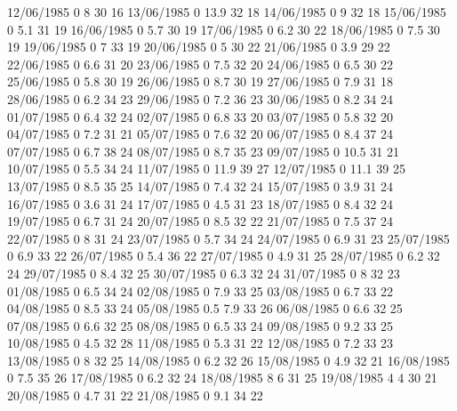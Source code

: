 12/06/1985  0      8      30     16 
13/06/1985  0      13.9   32     18 
14/06/1985  0      9      32     18 
15/06/1985  0      5.1    31     19 
16/06/1985  0      5.7    30     19 
17/06/1985  0      6.2    30     22 
18/06/1985  0      7.5    30     19 
19/06/1985  0      7      33     19 
20/06/1985  0      5      30     22 
21/06/1985  0      3.9    29     22 
22/06/1985  0      6.6    31     20 
23/06/1985  0      7.5    32     20 
24/06/1985  0      6.5    30     22 
25/06/1985  0      5.8    30     19 
26/06/1985  0      8.7    30     19 
27/06/1985  0      7.9    31     18 
28/06/1985  0      6.2    34     23 
29/06/1985  0      7.2    36     23 
30/06/1985  0      8.2    34     24 
01/07/1985  0      6.4    32     24 
02/07/1985  0      6.8    33     20 
03/07/1985  0      5.8    32     20 
04/07/1985  0      7.2    31     21 
05/07/1985  0      7.6    32     20 
06/07/1985  0      8.4    37     24 
07/07/1985  0      6.7    38     24 
08/07/1985  0      8.7    35     23 
09/07/1985  0      10.5   31     21 
10/07/1985  0      5.5    34     24 
11/07/1985  0      11.9   39     27 
12/07/1985  0      11.1   39     25 
13/07/1985  0      8.5    35     25 
14/07/1985  0      7.4    32     24 
15/07/1985  0      3.9    31     24 
16/07/1985  0      3.6    31     24 
17/07/1985  0      4.5    31     23 
18/07/1985  0      8.4    32     24 
19/07/1985  0      6.7    31     24 
20/07/1985  0      8.5    32     22 
21/07/1985  0      7.5    37     24 
22/07/1985  0      8      31     24 
23/07/1985  0      5.7    34     24 
24/07/1985  0      6.9    31     23 
25/07/1985  0      6.9    33     22 
26/07/1985  0      5.4    36     22 
27/07/1985  0      4.9    31     25 
28/07/1985  0      6.2    32     24 
29/07/1985  0      8.4    32     25 
30/07/1985  0      6.3    32     24 
31/07/1985  0      8      32     23 
01/08/1985  0      6.5    34     24 
02/08/1985  0      7.9    33     25 
03/08/1985  0      6.7    33     22 
04/08/1985  0      8.5    33     24 
05/08/1985  0.5    7.9    33     26 
06/08/1985  0      6.6    32     25 
07/08/1985  0      6.6    32     25 
08/08/1985  0      6.5    33     24 
09/08/1985  0      9.2    33     25 
10/08/1985  0      4.5    32     28 
11/08/1985  0      5.3    31     22 
12/08/1985  0      7.2    33     23 
13/08/1985  0      8      32     25 
14/08/1985  0      6.2    32     26 
15/08/1985  0      4.9    32     21 
16/08/1985  0      7.5    35     26 
17/08/1985  0      6.2    32     24 
18/08/1985  8      6      31     25 
19/08/1985  4      4      30     21 
20/08/1985  0      4.7    31     22 
21/08/1985  0      9.1    34     22 
